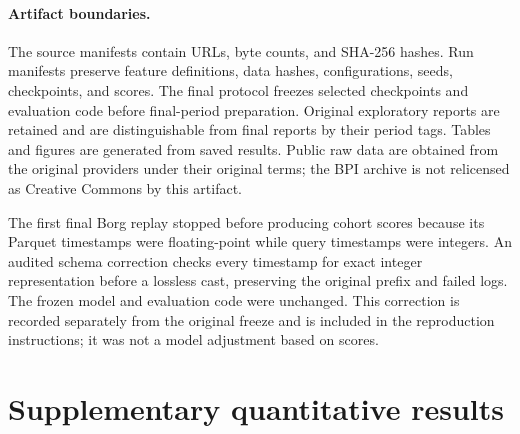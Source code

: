 \paragraph{Artifact boundaries.}
The source manifests contain URLs, byte counts, and SHA-256 hashes. Run
manifests preserve feature definitions, data hashes, configurations, seeds,
checkpoints, and scores. The final protocol freezes selected checkpoints and
evaluation code before final-period preparation. Original exploratory reports
are retained and are distinguishable from final reports by their period tags.
Tables and figures are generated from saved results. Public raw data are
obtained from the original providers under their original terms; the BPI
archive is not relicensed as Creative Commons by this artifact.

The first final Borg replay stopped before producing cohort scores because its
Parquet timestamps were floating-point while query timestamps were integers.
An audited schema correction checks every timestamp for exact integer
representation before a lossless cast, preserving the original prefix and
failed logs. The frozen model and evaluation code were unchanged. This
correction is recorded separately from the original freeze and is included in
the reproduction instructions; it was not a model adjustment based on scores.

\section{Supplementary quantitative results}

